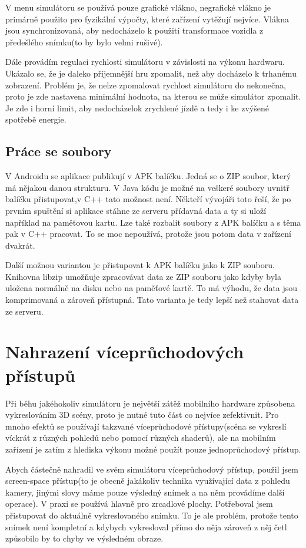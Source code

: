 \documentclass[11pt,twoside,a4paper]{book}
\begin{document}
V menu simulátoru se používá pouze grafické vlákno, negrafické vlákno je primárně použito pro fyzikální výpočty, které zařízení vytěžují nejvíce. Vlákna jsou synchronizovaná, aby nedocházelo k použití transformace vozidla z předešlého snímku(to by bylo velmi rušivé).

Dále provádím regulaci rychlosti simulátoru v závislosti na výkonu hardwaru. Ukázalo se, že je daleko příjemnější hru zpomalit, než aby docházelo k trhanému zobrazení. Problém je, že nelze zpomalovat rychlost simulátoru do nekonečna, proto je zde nastavena minimální hodnota, na kterou se může simulátor zpomalit. Je zde i horní limit, aby nedocházelo\linebreak k zrychlené jízdě a tedy i ke zvýšené spotřebě energie.

\subsection{Práce se soubory}
V Androidu se aplikace publikují v APK balíčku. Jedná se o ZIP soubor, který má nějakou danou strukturu. V Java kódu je možné na veškeré soubory uvnitř balíčku přistupovat,\linebreak v C++ tato možnost není. Někteří vývojáři toto řeší, že po prvním spuštění si aplikace stáhne ze serveru přídavná data a ty si uloží například na paměťovou kartu. Lze také rozbalit soubory z APK balíčku a s těma pak v C++ pracovat. To se moc nepoužívá, protože jsou potom data v zařízení dvakrát.

Další možnou variantou je přistupovat k APK balíčku jako k ZIP souboru. Knihovna libzip umožňuje zpracovávat data ze ZIP souboru jako kdyby byla uložena normálně na disku nebo na paměťové kartě. To má výhodu, že data jsou komprimovaná a zároveň přístupná. Tato varianta je tedy lepší než stahovat data ze serveru.

\section{Nahrazení víceprůchodových přístupů}
Při běhu jakéhokoliv simulátoru je největší zátěž mobilního hardware způsobena vykreslováním 3D scény, proto je nutné tuto část co nejvíce zefektivnit. Pro mnoho efektů se používají takzvané víceprůchodové přístupy(scéna se vykreslí víckrát z různých pohledů nebo pomocí různých shaderů), ale na mobilním zařízení je zatím z hlediska výkonu možné použít pouze jednoprůchodový přístup.

Abych částečně nahradil ve svém simulátoru víceprůchodový přístup, použil jsem screen-space přístup(to je obecně jakákoliv technika využívající data z pohledu kamery, jinými slovy máme pouze výsledný snímek a na něm provádíme další operace). V praxi se používá hlavně pro zrcadlové plochy. Potřeboval jsem přistupovat do aktuálně vykreslovaného snímku. To je ale problém, protože tento snímek není kompletní a kdybych vykresloval přímo do něj\linebreak a zároveň z něj četl způsobilo by to chyby ve výsledném obraze.
\end{document}
